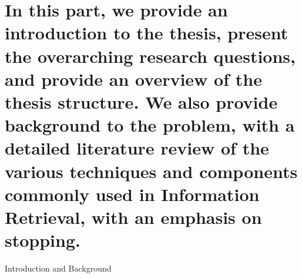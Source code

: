 
\part[Introduction and Background]{In this part, we provide an introduction to the thesis, present the overarching research questions, and provide an overview of the thesis structure. We also provide background to the problem, with a detailed literature review of the various techniques and components commonly used in Information Retrieval, with an emphasis on stopping.}{Introduction and Background}
\label{part:intro}
